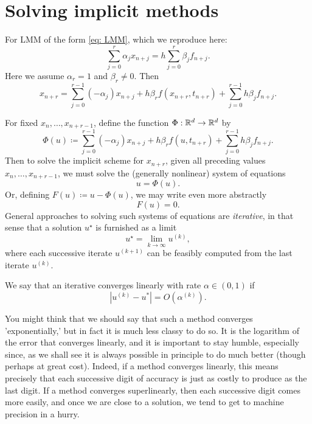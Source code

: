 \chapter{Solving implicit methods} 
For LMM of the form \eqref{eq: LMM}, which we reproduce here: 
\[
    \sum_{j=0}^{r} \alpha _j x_{n+j} = h \sum_{j=0}^{r} \beta _j f_{n+j}.   
\]
Here we assume $ \alpha _r = 1 $ and $ \beta _r \neq 0 $. Then 
\[
    x_{n+r} = \sum_{j=0}^{r-1} (-\alpha _j) x_{n+j} + h \beta _r f(x_{n+r}, t_{n+r}) + \sum_{j=0}^{r-1} h\beta _j f_{n+j}.   
\]

For fixed $ x_n,\ldots ,x_{n+r-1}$, define the function $ \Phi: \mathbb{R}^{d}\to \mathbb{R}^{d} $ by 
\[
    \Phi(u) \coloneqq \sum_{j=0}^{r-1} (-\alpha _j) x_{n+j} + h \beta _r f(u, t_{n+r})  + \sum_{j=0}^{r-1} h\beta _j f_{n+j}.   
\]
Then to solve the implicit scheme for $ x_{n+r} $, given all preceding values $ x_n,\ldots ,x_{n+r-1}$, we must solve the (generally nonlinear) system of equations
\begin{equation}
\label{eq: solve implicit method}
    u = \Phi(u). 
\end{equation}
Or, defining $ F(u)\coloneqq  u - \Phi(u) $, we may write even more abstractly 
\begin{equation}
\label{eq: solve implicit method root}
    F(u) = 0.
\end{equation}
General approaches to solving such systems of equations are \textit{iterative}, in that sense that a solution $ u^\star $ is furnished as a limit
\[
    u^\star = \lim_{k\to \infty}u^{(k)}, 
\]
where each successive iterate $ u^{(k+1)} $ can be feasibly computed from the last iterate $ u^{(k)} $. 


\begin{definition}
\label{def: Linear convergence}
We say that an iterative converges linearly with rate $ \alpha \in (0,1) $ if 
\[
    |u^{(k)} - u ^*| = O(\alpha ^{(k)}). 
\]
\end{definition}
You might think that we should say that such a method converges 'exponentially,' but in fact it is much less classy to do so. It is the logarithm of the error that converges linearly, and it is important to stay humble, especially since, as we shall see it is always possible in principle to do much better (though perhaps at great cost). Indeed, if a method converges linearly, this means precisely that each successive digit of accuracy is just as costly to produce as the last digit. If a method converges superlinearly, then each successive digit comes more easily, and once we are close to a solution, we tend to get to machine precision in a hurry.

